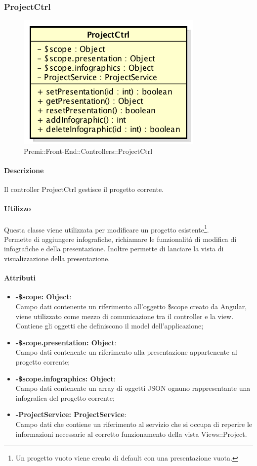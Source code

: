 \newpage


\subsubsection{ProjectCtrl}
\begin{figure}[h]
	\centering
	\includegraphics[width=0.4\linewidth]{img/premi_front_end_controllers_projectctrl}
	\caption[Premi::Front-End::Controllers::ProjectCtrl]{Premi::Front-End::Controllers::ProjectCtrl}
\end{figure}
	\paragraph{Descrizione}
	Il controller ProjectCtrl gestisce il progetto corrente.

	\paragraph{Utilizzo}
	Questa classe viene utilizzata per modificare un progetto esistente\footnote{Un progetto vuoto viene creato di default con una presentazione vuota.}.\\
	Permette di aggiungere infografiche, richiamare le funzionalità di modifica di infografiche e della presentazione. Inoltre permette di lanciare la vista di visualizzazione della presentazione.
	\paragraph{Attributi}
	\begin{itemize}
		\item \textbf{-\$scope: Object}:\\
			Campo dati contenente un riferimento all'oggetto \$scope creato da Angular, viene utilizzato come mezzo di comunicazione tra il controller e la view. Contiene gli oggetti che definiscono il model dell'applicazione;
		\item \textbf{-\$scope.presentation: Object}:\\
			Campo dati contenente un riferimento alla presentazione appartenente al progetto corrente;
		\item \textbf{-\$scope.infographics: Object}:\\
			Campo dati contenente un array di oggetti JSON ognuno rappresentante una infografica del progetto corrente;
		\item \textbf{-ProjectService: ProjectService}:\\
			Campo dati che contiene un riferimento al servizio che si occupa di reperire le informazioni necessarie al corretto funzionamento della vista Views::Project.
	\end{itemize}

